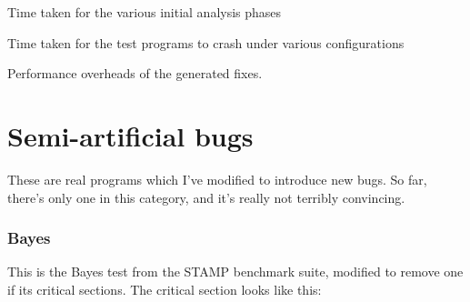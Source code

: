 \begin{sidewaystable}

\caption{Time taken for the various initial analysis phases}
\label{table:eval:analysis_phases}
\end{sidewaystable}

\begin{sidewaystable}

\caption{Time taken for the test programs to crash under various configurations}
\label{table:eval:crash_times}
\end{sidewaystable}

\begin{sidewaystable}

\caption{Performance overheads of the generated fixes.}  
\label{table:eval:perf_dists}
\end{sidewaystable}



\section{Semi-artificial bugs}

These are real programs which I've modified to introduce new bugs.  So
far, there's only one in this category, and it's really not terribly
convincing.

\subsubsection{Bayes}

This is the Bayes test from the STAMP benchmark suite, modified to
remove one if its critical sections.  The critical section looks like
this:

